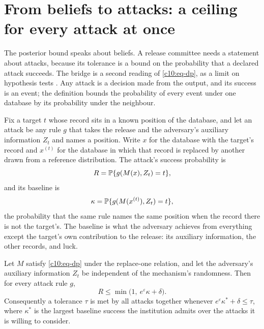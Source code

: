 \section{From beliefs to attacks: a ceiling for every attack at once}

The posterior bound speaks about beliefs. A release committee needs a statement
about attacks, because its tolerance is a bound on the probability that a declared
attack succeeds. The bridge is a second reading of \eqref{c10:eq-dp}, as a limit on
hypothesis tests \citep{wasserman2010,kairouz2017,dong2022,balle2020}. Any attack
is a decision made from the output, and its success is an event; the definition
bounds the probability of every event under one database by its probability under
the neighbour.

Fix a target $t$ whose record sits in a known position of the database, and let
an attack be any rule $g$ that takes the release and the adversary's auxiliary
information $Z_t$ and names a position. Write $x$ for the database with the
target's record and $x^{(t)}$ for the database in which that record is replaced
by another drawn from a reference distribution. The attack's success
probability is
\begin{equation}\label{c10:eq-R}
R = \mathbb{P}\{g(M(x), Z_t) = t\},
\end{equation}
and its baseline is
\begin{equation}\label{c10:eq-kappa}
\kappa = \mathbb{P}\{g(M(x^{(t)}), Z_t) = t\},
\end{equation}
the probability that the same rule names the same position when the record there
is not the target's. The baseline is what the adversary achieves from everything
except the target's own contribution to the release: its auxiliary information,
the other records, and luck.

\begin{proposition}\label{c10:prop-ceiling}
Let $M$ satisfy \eqref{c10:eq-dp} under the replace-one relation, and let the
adversary's auxiliary information $Z_t$ be independent of the mechanism's
randomness. Then for every attack rule $g$,
\begin{equation}\label{c10:eq-ceiling}
R \le \min\bigl(1,\ e^{\varepsilon}\kappa + \delta\bigr).
\end{equation}
Consequently a tolerance $\tau$ is met by all attacks together whenever
$e^{\varepsilon}\kappa^\ast + \delta \le \tau$, where $\kappa^\ast$ is the largest
baseline success the institution admits over the attacks it is willing to
consider.
\end{proposition}

